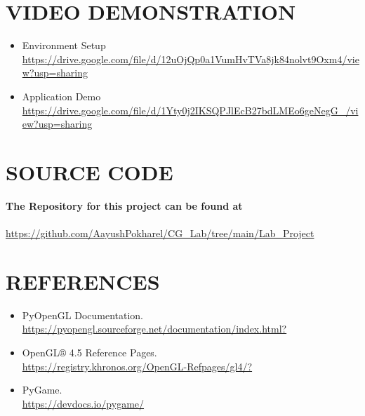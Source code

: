 \documentclass[12pt]{article}
\begin{document}
\clearpage

\section{VIDEO DEMONSTRATION}
\begin{itemize}
    \item Environment Setup\\
          \url{https://drive.google.com/file/d/12uOjQp0a1VumHvTVa8jk84nolvt9Oxm4/view?usp=sharing}
    \item Application Demo\\
          \url{https://drive.google.com/file/d/1Yty0j2IKSQPJlEcB27bdLMEo6geNegG_/view?usp=sharing}
\end{itemize}

\section{SOURCE CODE}
\textbf{The Repository for this project can be found at }\\\\ \url{https://github.com/AayushPokharel/CG_Lab/tree/main/Lab_Project}
\clearpage

\section{REFERENCES}
\begin{itemize}
    \item PyOpenGL Documentation.\\ \url{https://pyopengl.sourceforge.net/documentation/index.html?}

    \item OpenGL® 4.5 Reference Pages.\\ \url{https://registry.khronos.org/OpenGL-Refpages/gl4/?}

    \item PyGame.\\
          \url{https://devdocs.io/pygame/}
\end{itemize}
\end{document}
